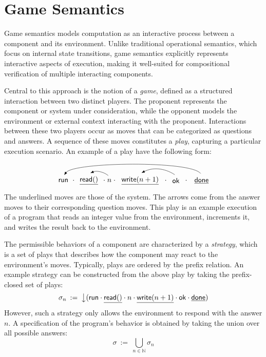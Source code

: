 \section{Game Semantics}

Game semantics\citep{cspgs}
models computation as an interactive process
between a component and its environment.
Unlike traditional operational semantics,
which focus on internal state transitions,
game semantics explicitly represents
interactive aspects of execution,
making it well-suited for compositional verification
of multiple interacting components.

Central to this approach is the notion of a \emph{game},
defined as a structured interaction
between two distinct players.
The proponent represents the component or system
under consideration,
while the opponent models the environment
or external context interacting with the proponent.
Interactions between these two players
occur as moves that can be categorized as
questions and answers.
A sequence of these moves constitutes a \emph{play},
capturing a particular execution scenario.
An example of a play have the following form:
\[
  \begin{tikzpicture}[baseline=(current bounding box.center)]
    \node (q) at (0,0) {$\kw{run}$};
    \node at (0.5,0) {$\cdot$};
    \node (m1) at (1.25,0) {$\underline{\kw{read}()}$};
    \node at (2,0) {$\cdot$};
    \node (n1) at (2.25,0) {$n$};
    \node at (2.5,0) {$\cdot$};
    \node (m2) at (3.75,0) {$\underline{\kw{write}(n + 1)}$};
    \node at (5,0) {$\cdot$};
    \node (n2) at (5.5,0) {$\kw{ok}$};
    \node at (6,0) {$\cdot$};
    \node (r) at (6.75,0) {$\underline{\kw{done}}$};

    \draw[{Latex}-, shorten <=2pt, shorten >=2pt] (q.north).. controls +(0.5cm, 0.7cm) and +(-0.5cm, 0.7cm) .. (r.north);
    \draw[{Latex}-, bend left=30, shorten <=2pt, shorten >=2pt] (m1.north) to (n1.north);
    \draw[{Latex}-, bend left=30, shorten <=2pt, shorten >=2pt] (m2.north) to (n2.north);
  \end{tikzpicture}
\]
The underlined moves are those of the system.
The arrows come from the answer moves
to their corresponding question moves.
This play is an example execution of a program
that reads an integer value from the environment,
increments it,
and writes the result back to the environment.

The permissible behaviors of a component
are characterized by a \emph{strategy},
which is a set of plays
that describes how the component
may react to the environment's moves.
Typically,
plays are ordered by the prefix relation.
An example strategy can be constructed
from the above play
by taking the prefix-closed set of plays:
\[
  \sigma_n \::=\: \big\downarrow ( \mathsf{run}  \cdot \underline{ \mathsf{read} ()} \cdot n \cdot \underline{ \mathsf{write} (n + 1)} \cdot  \mathsf{ok}  \cdot \underline{ \mathsf{done} })
\]
However,
such a strategy
only allows the environment to
respond with the answer $n$.
A specification of the program's behavior
is obtained by taking the union over all possible answers:
\[
  \sigma \::=\: \bigcup_{n \in \mathbb{N}} \sigma_n
\]

